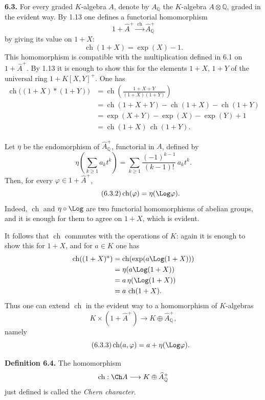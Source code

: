 \documentclass[11pt]{article}
\newcommand{\ch}{\operatorname{ch}}
\providecommand{\ch}{\operatorname{ch}}
\begin{document}
\textbf{6.3.} For every graded \(K\)-algebra \(A\), denote by \(A_{\mathbb Q}\) the \(K\)-algebra \(A\otimes\mathbb Q\), graded in the evident way. By 1.13 one defines a functorial homomorphism
\[
  1+\widehat A^+\xrightarrow{\ \ch\ }\widehat A_{\mathbb Q}^{+}
\]
by giving its value on \(1+X\):
\begin{equation}\tag{6.3.1}
  \ch(1+X)=\exp(X)-1.
\end{equation}
This homomorphism is compatible with the multiplication defined in 6.1 on \(1+\widehat A^+\). By 1.13 it is enough to show this for the elements \(1+X\), \(1+Y\) of the universal ring \(1+K[X,Y]^+\). One has
\[
\begin{aligned}
 \ch\bigl((1+X)*(1+Y)\bigr)
 &= \ch\!\left(\frac{1+X+Y}{(1+X)(1+Y)}\right)\\
 &= \ch(1+X+Y)-\ch(1+X)-\ch(1+Y)\\
 &= \exp(X+Y)-\exp(X)-\exp(Y)+1\\
 &= \ch(1+X)\,\ch(1+Y).
\end{aligned}
\]

Let \(\eta\) be the endomorphism of \(\widehat A_{\mathbb Q}^{+}\), functorial in \(A\), defined by
\[
 \eta\!\left(\sum_{k\ge1} a_k t^k\right)
 =
 \sum_{k\ge1}\frac{(-1)^{k-1}}{(k-1)!}\,a_k t^k.
\]
Then, for every \(\varphi\in1+\widehat A^+\),
\begin{equation}\tag{6.3.2}
  \ch(\varphi)=\eta(\Log\varphi).
\end{equation}
Indeed, \(\ch\) and \(\eta\circ\Log\) are two functorial homomorphisms of abelian groups, and it is enough for them to agree on \(1+X\), which is evident.

It follows that \(\ch\) commutes with the operations of \(K\): again it is enough to show this for \(1+X\), and for \(a\in K\) one has
\[
\begin{aligned}
 \ch((1+X)^a)
 &=\ch(\exp(a\Log(1+X)))\\
 &=\eta(a\Log(1+X))\\
 &=a\,\eta(\Log(1+X))\\
 &=a\,\ch(1+X).
\end{aligned}
\]
Thus one can extend \(\ch\) in the evident way to a homomorphism of \(K\)-algebras
\[
  K\times(1+\widehat A^+)\longrightarrow K\oplus\widehat A_{\mathbb Q}^{+},
\]
namely
\begin{equation}\tag{6.3.3}
  \ch(a,\varphi)=a+\eta(\Log\varphi).
\end{equation}

\textbf{Definition 6.4.} The homomorphism
\[
  \ch:\Ch A\longrightarrow K\oplus\widehat A_{\mathbb Q}^{+}
\]
just defined is called the \emph{Chern character}.
\end{document}
